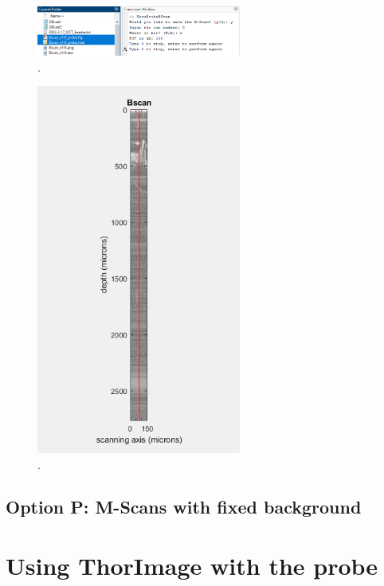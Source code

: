\documentclass{article}
\begin{document}
\begin{figure}[!h]
	\centering
	\includegraphics[width=0.6\textwidth]{Data for Probe Writeup/ShowProbeBScan operation.png}
	\caption{.}
\end{figure}

\begin{figure}[!h]
	\centering
	\includegraphics[width=0.6\textwidth]{Data for Probe Writeup/BScan fig update.png}
	\caption{.}
\end{figure}

\subsection{Option P: M-Scans with fixed background}

\par{}

\section{Using ThorImage with the probe}\label{thorimagesection}
\hypertarget{thorimagesection}{}
\end{document}
